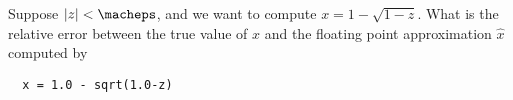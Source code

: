 \documentclass[12pt, leqno]{article}
\begin{document}

Suppose $|z| < \macheps$, and we want to compute $x = 1-\sqrt{1-z}$.
What is the relative error between the true value of $x$ and the floating point approximation $\hat{x}$ computed by
\begin{lstlisting}
  x = 1.0 - sqrt(1.0-z)
\end{lstlisting}
\end{document}

